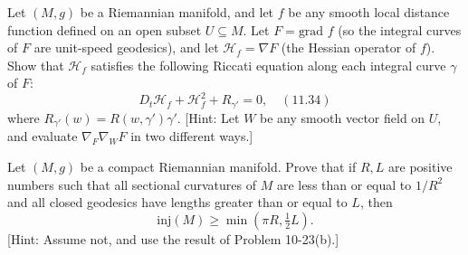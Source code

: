 \begin{exercise}\label{prob:riccati-equation}
Let $(M, g)$ be a Riemannian manifold, and let $f$ be any smooth local distance function defined on an open subset $U \subseteq M$. Let $F = \text{grad } f$ (so the integral curves of $F$ are unit-speed geodesics), and let $\mathcal{H}_f = \nabla F$ (the Hessian operator of $f$). Show that $\mathcal{H}_f$ satisfies the following Riccati equation along each integral curve $\gamma$ of $F$:
\[
D_t \mathcal{H}_f + \mathcal{H}_f^2 + R_{\gamma'} = 0, \quad (11.34)
\]
where $R_{\gamma'}(w) = R(w, \gamma')\gamma'$. [Hint: Let $W$ be any smooth vector field on $U$, and evaluate $\nabla_F \nabla_W F$ in two different ways.]
\end{exercise}

\begin{exercise}\label{prob:injectivity-radius-comparison}
Let $(M, g)$ be a compact Riemannian manifold. Prove that if $R, L$ are positive numbers such that all sectional curvatures of $M$ are less than or equal to $1/R^2$ and all closed geodesics have lengths greater than or equal to $L$, then
\[
\text{inj}(M) \geq \min(\pi R, \tfrac{1}{2}L).
\]
[Hint: Assume not, and use the result of Problem 10-23(b).]
\end{exercise}

